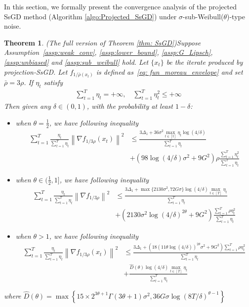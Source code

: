 \documentclass{article}
\newtheorem{theorem}{Theorem}
\def \sumT {\sum_{t=1}^T}
\def \nab {\nabla}
\newcommand{\norm}[2][]{\left\|#2\right\|^{#1}}
\newcommand{\Brace}[1]{\left(#1\right)}
\begin{document}
In this section, we formally present the convergence analysis of the projected SsGD method (Algorithm \ref{algo:Projected_SsGD}) under $\sigma$-sub-Weibull($\theta$)-type noise.
\begin{theorem}{(The full version of Theorem \ref{thm: SsGD})}\label{app_thm:full_version_projSsGD_general_thm}
    Suppose Assumption~\ref{assp:weak_conv}, \ref{assp:lower_bound}, \ref{assp:G_Lipsch}, \ref{assp:unbiased} and \ref{assp:sub_weibull} hold. Let $\{x_t\}$ be the iterate produced by projection-SsGD. Let $f_{1/\bar{\rho}(x_t)}$ is defined as~\eqref{eq: fun_moreau_envelope} and set $\bar{\rho}=3\rho$. If $\eta_t$ satisfy 
    \begin{align}
        \sum_{t=1}^T \eta_t = +\infty,\quad \sum_{t=1}^T\eta_t^2 \leq +\infty
    \end{align}
    Then given any $\delta\in(0,1)$, with the probability at least $1-\delta$:
    \begin{itemize}
        \item when $\theta=\frac{1}{2} $, we have following inequality
        \begin{align}
            \sumT\frac{\eta_t}{\sumT\eta_t}\norm[2]{\nab f_{1/3\rho}(x_t)} &\leq \frac{3\Delta_1+36\sigma^2\max_{t\in[t]}\eta_t\log(4/\delta)}{\sumT\eta_t}\nonumber\\
            &+\Brace{98\log(4/\delta)\sigma^2+9G^2}\rho\frac{\sumT\eta_t^2}{\sumT\eta_t}  
        \end{align}
        \item when $\theta\in(\frac{1}{2},1]$, we have following inequality 
        \begin{align}
            \sumT \frac{\eta_t}{\sumT\eta_t}\norm[2]{\nab f_{1/3\rho}}&\leq \frac{3\Delta_1+\max\{2130\sigma^2,72G\sigma\}\log(4/\delta)\max_{t\in[T]}\eta_t}{\sumT\eta_t}\nonumber\\
    &+ (2130\sigma^2\log(4/\delta)^{2\theta}+9G^2)\frac{\sumT\rho\eta_t^2}{\sumT\eta_t}
        \end{align}
        \item when $\theta>1$, we have following inequality
        \begin{align}
            \sumT\frac{\eta_t}{\sumT\eta_t}\norm[2]{\nab f_{1/3\rho}(x_t)}&\leq\frac{3\Delta_1+\Brace{18(11\theta\log(4/\delta))^{2\theta}\sigma^2+9G^2}\sumT\rho\eta_t^2}{\sumT\eta_t}\nonumber\\
    &+ \frac{\widehat{D}(\theta)\log(4/\delta)\max_{t\in[T]}\eta_t}{\sumT\eta_t}
        \end{align}
    \end{itemize}
    where $\widehat{D}(\theta)=\max\left\{15\times2^{3\theta+1}\Gamma(3\theta+1)\sigma^2,36G\sigma\log(8T/\delta)^{\theta-1}\right\}$
\end{theorem}
\end{document}
